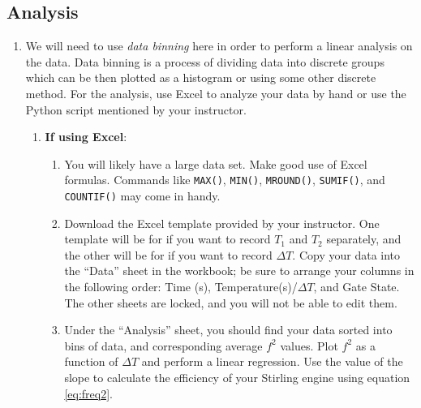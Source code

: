 \documentclass{article}
\newcommand\setItemnumber[1]{\setcounter{enumi}{\numexpr#1-1\relax}}
\begin{document}
\subsection{Analysis}
\begin{enumerate}
    \setItemnumber{11}
    \item We will need to use \textit{data binning} here in order to perform a linear analysis on the data. Data binning is a process of dividing data into discrete groups which can be then plotted as a histogram or using some other discrete method. For the analysis, use Excel to analyze your data by hand or use the Python script mentioned by your instructor. 
    \begin{enumerate}
        \item \textbf{If using Excel}: 
        \begin{enumerate}
            \item You will likely have a large data set. Make good use of Excel formulas. Commands like \verb'MAX()', \verb'MIN()', \verb'MROUND()', \verb'SUMIF()', and \verb'COUNTIF()' may come in handy.
            \item Download the Excel template provided by your instructor. One template will be for if you want to record $T_1$ and $T_2$ separately, and the other will be for if you want to record $\Delta T$. Copy your data into the ``Data'' sheet in the workbook; be sure to arrange your columns in the following order: Time (s), Temperature(s)/$\Delta T$, and Gate State. The other sheets are locked, and you will not be able to edit them.
            \item Under the ``Analysis'' sheet, you should find your data sorted into bins of data, and corresponding average $f^2$ values. Plot $f^2$ as a function of $\Delta T$ and perform a linear regression. Use the value of the slope to calculate the efficiency of your Stirling engine using equation \eqref{eq:freq2}.
        \end{enumerate}

\end{enumerate}
\end{enumerate}
\end{document}
